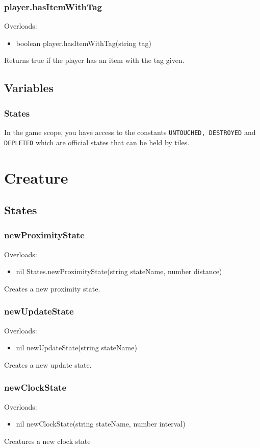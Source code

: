\documentclass{book}
\newenvironment{ulist}
	{\begin{itemize}
			\itemsep0em}
	{\end{itemize}}
\begin{document}
\subsubsection{player.hasItemWithTag}
Overloads:
\begin{ulist}
	\item boolean player.hasItemWithTag(string tag)
\end{ulist}
Returns true if the player has an item with the tag given.

\subsection{Variables}
\subsubsection{States}
In the game scope, you have access to the constants \texttt{UNTOUCHED, DESTROYED} and \texttt{DEPLETED} which are official states that can be held by tiles.

\section{Creature}
\subsection{States}
\subsubsection{newProximityState}
Overloads:
\begin{ulist}
	\item nil States.newProximityState(string stateName, number distance)
\end{ulist}
Creates a new proximity state.

\subsubsection{newUpdateState}
Overloads:
\begin{ulist}
	\item nil newUpdateState(string stateName)
\end{ulist}
Creates a new update state.

\subsubsection{newClockState}
Overloads:
\begin{ulist}
	\item nil newClockState(string stateName, number interval)
\end{ulist}
Creatures a new clock state
\end{document}
